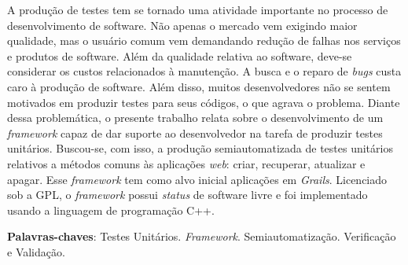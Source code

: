 \begin{resumo}
A produção de testes tem se tornado uma atividade importante no processo de desenvolvimento de software. Não apenas o mercado vem exigindo maior qualidade, mas o usuário comum vem demandando redução de falhas nos serviços e produtos de software. Além da qualidade relativa ao software, deve-se considerar os custos relacionados à manutenção. A busca e o reparo de \textit{bugs} custa caro à produção de software. Além disso, muitos desenvolvedores não se sentem motivados em produzir testes para seus códigos, o que agrava o problema. Diante dessa problemática, o presente trabalho relata sobre o desenvolvimento de um \textit{framework} capaz de dar suporte ao desenvolvedor na tarefa de produzir testes unitários. Buscou-se, com isso, a produção semiautomatizada de testes unitários relativos a métodos comuns às aplicações \textit{web}: criar, recuperar, atualizar e apagar. Esse \textit{framework} tem como alvo inicial aplicações em \textit{Grails}. Licenciado sob a GPL, o \textit{framework} possui \textit{status} de software livre e foi implementado usando a linguagem de programação C++.
\vspace{\onelineskip}
    
\noindent
\textbf{Palavras-chaves}: Testes Unitários. \textit{Framework}. Semiautomatização. Verificação e Validação.
\end{resumo}
